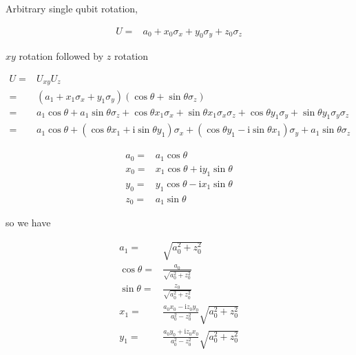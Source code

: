 \documentclass[10pt,fleqn]{article}
\newcommand{\ui}{\mathrm{i}}
\newcommand{\eqar}[1]
{
  \begin{align*}
    #1
  \end{align*}
}
\newcommand{\paren}[1]{{\left({#1}\right)}}
\begin{document}
Arbitrary single qubit rotation,
\eqar{
  U=&a_0 + x_0 \sigma_x + y_0 \sigma_y + z_0 \sigma_z
}
$xy$ rotation followed by $z$ rotation
\eqar{
  U=&U_{xy} U_z\\
  =&\paren{a_1 + x_1 \sigma_x + y_1 \sigma_y}\paren{\cos\theta + \sin\theta \sigma_z}\\
  =&a_1\cos\theta + a_1\sin\theta \sigma_z + \cos\theta x_1 \sigma_x + \sin\theta x_1 \sigma_x\sigma_z + \cos\theta y_1 \sigma_y + \sin\theta y_1 \sigma_y\sigma_z\\
  =&a_1\cos\theta + \paren{\cos\theta x_1 + \ui \sin\theta y_1} \sigma_x + \paren{\cos\theta y_1 - \ui \sin\theta x_1} \sigma_y + a_1\sin\theta \sigma_z
}
\eqar{
  a_0=&a_1\cos\theta\\
  x_0=&x_1\cos\theta + \ui y_1\sin\theta\\
  y_0=&y_1\cos\theta - \ui x_1\sin\theta\\
  z_0=&a_1\sin\theta
}
so we have
\eqar{
  a_1=&\sqrt{a_0^2+z_0^2}\\
  \cos\theta=&\frac{a_0}{\sqrt{a_0^2+z_0^2}}\\
  \sin\theta=&\frac{z_0}{\sqrt{a_0^2+z_0^2}}\\
  x_1=&\frac{a_0x_0-\ui z_0y_0}{a_0^2 - z_0^2}\sqrt{a_0^2+z_0^2}\\
  y_1=&\frac{a_0y_0+\ui z_0x_0}{a_0^2 - z_0^2}\sqrt{a_0^2+z_0^2}
}
\end{document}
